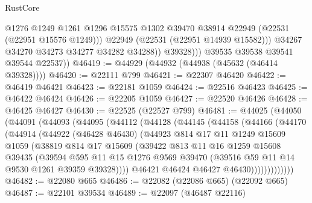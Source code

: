 \begin{lexlean}{RustCore}
\begin{coremodule}
                      @1276
                      @1249
                      @1261
                      @1296
                      @15575
                      @1302
                      @39470
                      @38914
                      @22949
                      (@22531 (@22951 @15576 @1249)))
                    @22949
                    (@22531 (@22951 @14939 @15582)))
                  @34267
                  @34270
                  @34273
                  @34277
                  @34282
                  @34288))
              @39328)))
        @39535
        @39538
        @39541
        @39544
        @22537))
@46419 := @44929 (@44932 (@44938 (@45632 (@46414 @39328))))
@46420 := @22111 @799
@46421 := @22307 @46420
@46422 := @46419 @46421
@46423 := @22181 @1059
@46424 := @22516 @46423
@46425 := @46422 @46424
@46426 := @22205 @1059
@46427 := @22520 @46426
@46428 := @46425 @46427
@46430 := @22525 (@22527 @799)
@46481 := @44025
    (@44050
      (@44091
        (@44093
          (@44095
            (@44112
              (@44128
                (@44145
                  (@44158
                    (@44166
                      (@44170
                        (@44914
                          (@44922
                            (@46428 @46430)
                            (@44923
                              @814
                              @17
                              @11
                              @1249
                              @15609
                              @1059
                              (@38819
                                @814
                                @17
                                @15609
                                (@39422
                                  @813
                                  @11
                                  @16
                                  @1259
                                  @15608
                                  @39435
                                  (@39594
                                    @595
                                    @11
                                    @15
                                    @1276
                                    @9569
                                    @39470
                                    (@39516 @59 @11 @14 @9530 @1261 @39359 @39328))))
                              @46421
                              @46424
                              @46427
                              @46430)))))))))))))
@46482 := @22080 @665
@46486 := @22082 (@22086 @665) (@22092 @665)
@46487 := @22101 @39534
@46489 := @22097 (@46487 @22116)

\end{coremodule}
\end{lexlean}

